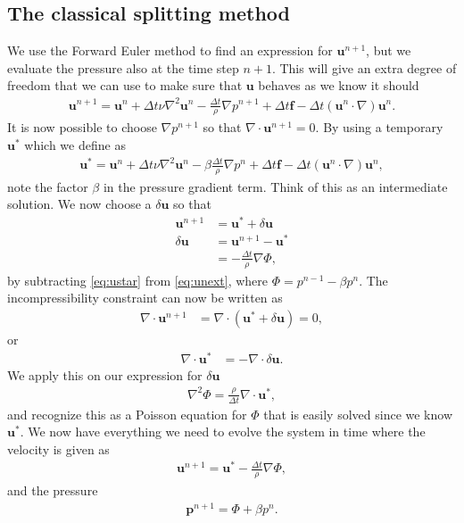 \documentclass[a4paper,10pt]{article}
\renewcommand{\vec}[1]{\mathbf{#1}}
\renewcommand{\(}{\left(}
\renewcommand{\)}{\right)}
\begin{document}
\subsection{The classical splitting method}
We use the Forward Euler method to find an expression for $\vec u^{n+1}$, but we evaluate the pressure also at the time step $n+1$. This will give an extra degree of freedom that we can use to make sure that $\vec u$ behaves as we know it should
\begin{align}
  \label{eq:unext}
  \vec u^{n+1} = \vec u^{n} + \Delta t\nu\nabla^2\vec u^n - \frac{\Delta t}{\rho}\nabla p^{n+1} + \Delta t\vec f - \Delta t(\vec u^n\cdot \nabla)\vec u^n.
\end{align}
It is now possible to choose $\nabla p^{n+1}$ so that $\nabla \cdot \vec u^{n+1} = 0$. By using a temporary $\vec u^*$ which we define as
\begin{align}
  \label{eq:ustar}
  \vec u^* = \vec u^{n} + \Delta t\nu\nabla^2\vec u^n - \beta\frac{\Delta t}{\rho}\nabla p^n + \Delta t\vec f - \Delta t(\vec u^n\cdot \nabla)\vec u^n,
\end{align}
note the factor $\beta$ in the pressure gradient term. Think of this as an intermediate solution. We now choose a $\delta \vec u$ so that
\begin{align*}
  \vec u^{n+1} &= \vec u^* + \delta \vec u\\
  \delta \vec u &= \vec u^{n+1} - \vec u^*\\
  &= -\frac{\Delta t}{\rho}\nabla \Phi,
\end{align*}
by subtracting \eqref{eq:ustar} from \eqref{eq:unext}, where $\Phi = p^{n-1} - \beta p^n$. The incompressibility constraint can now be written as
\begin{align*}
  \nabla \cdot \vec u^{n+1} &= \nabla\cdot(\vec u^* + \delta \vec u) = 0,
\end{align*}
or
\begin{align*}
  \nabla \cdot \vec u^* &= -\nabla \cdot\delta \vec u.
\end{align*}
We apply this on our expression for $\delta \vec u$
\begin{align*}
  \nabla^2 \Phi = \frac{\rho}{\Delta t}\nabla \cdot \vec u^*,
\end{align*}
and recognize this as a Poisson equation for $\Phi$ that is easily solved since we know $\vec u^*$. We now have everything we need to evolve the system in time where the velocity is given as
\begin{align}
  \label{eq:u_next}
  \vec u^{n+1} = \vec u^* - \frac{\Delta t}{\rho}\nabla \Phi,
\end{align}
and the pressure
\begin{align}
  \label{eq:p_next}
  \vec p^{n+1} = \Phi + \beta p^n.
\end{align}
\end{document}
